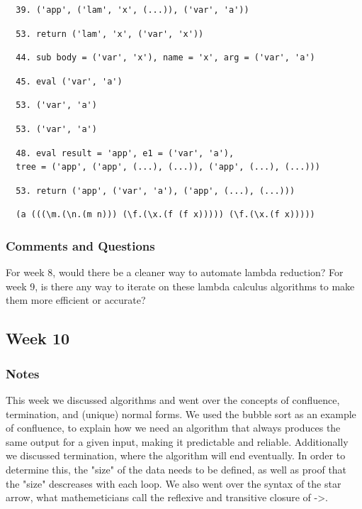 \documentclass{article}
\theoremstyle{theorem}
\theoremstyle{definition}
\theoremstyle{remark}
\begin{document}
\begin{verbatim}
  39. ('app', ('lam', 'x', (...)), ('var', 'a'))
\end{verbatim}

\begin{verbatim}
  53. return ('lam', 'x', ('var', 'x'))
\end{verbatim}

\begin{verbatim}
  44. sub body = ('var', 'x'), name = 'x', arg = ('var', 'a')
\end{verbatim}

\begin{verbatim}
  45. eval ('var', 'a')
\end{verbatim}

\begin{verbatim}
  53. ('var', 'a')
\end{verbatim}

\begin{verbatim}
  53. ('var', 'a')
\end{verbatim}

\begin{verbatim}
  48. eval result = 'app', e1 = ('var', 'a'), 
  tree = ('app', ('app', (...), (...)), ('app', (...), (...)))
\end{verbatim}

\begin{verbatim}
  53. return ('app', ('var', 'a'), ('app', (...), (...)))
\end{verbatim}

\begin{verbatim}
  (a (((\m.(\n.(m n))) (\f.(\x.(f (f x))))) (\f.(\x.(f x)))))
\end{verbatim}

\subsubsection{Comments and Questions}

For week 8, would there be a cleaner way to automate lambda reduction? For week 9, is there any way to iterate on these lambda calculus algorithms to make them more efficient or accurate?

\subsection{Week 10}

\subsubsection{Notes}
This week we discussed algorithms and went over the concepts of confluence, termination, and (unique) normal forms. We used the bubble sort as an example of confluence, to explain how 
we need an algorithm that always produces the same output for a given input, making it predictable and reliable. Additionally we discussed termination, where the algorithm will end eventually. In order to determine this,
the "size" of the data needs to be defined, as well as proof that the "size" descreases with each loop. We also went over the syntax of the star arrow, what mathemeticians call the reflexive and transitive closure of ->.
\end{document}
